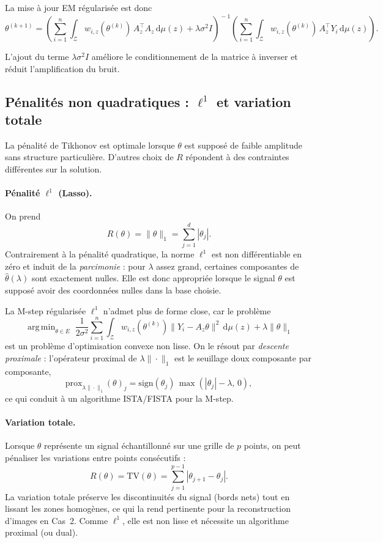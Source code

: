 \documentclass[12pt, a4paper]{article}
\theoremstyle{definition}
\newcommand{\Zcal}{\mathcal{Z}}
\DeclareMathOperator*{\argmin}{arg\,min}
\begin{document}
La mise à jour EM régularisée est donc
\begin{equation}
\label{eq:mstep_reg}
\theta^{(k+1)}
=
\left(
\sum_{i=1}^n \int_{\Zcal}
w_{i,z}(\theta^{(k)})\,
A_z^\top A_z
\,\mathrm{d}\mu(z)
+
\lambda\sigma^2 I
\right)^{\!-1}
\left(
\sum_{i=1}^n \int_{\Zcal}
w_{i,z}(\theta^{(k)})\,
A_z^\top Y_i
\,\mathrm{d}\mu(z)
\right).
\end{equation}

L’ajout du terme $\lambda\sigma^2 I$ améliore le conditionnement de la matrice à
inverser et réduit l’amplification du bruit.

\subsection{Pénalités non quadratiques : $\ell^1$ et variation totale}
\label{subsec:penalites_nonquad}

La pénalité de Tikhonov est optimale lorsque $\theta$ est supposé de faible amplitude
sans structure particulière. D'autres choix de $R$ répondent à des contraintes
différentes sur la solution.

\paragraph{Pénalité $\ell^1$ (Lasso).}
On prend
\[
  R(\theta) = \|\theta\|_1 = \sum_{j=1}^d |\theta_j|.
\]
Contrairement à la pénalité quadratique, la norme $\ell^1$ est non différentiable en
zéro et induit de la \emph{parcimonie} : pour $\lambda$ assez grand, certaines
composantes de $\hat\theta(\lambda)$ sont exactement nulles. Elle est donc appropriée
lorsque le signal $\theta$ est supposé avoir des coordonnées nulles dans la base choisie.

La M-step régularisée $\ell^1$ n'admet plus de forme close, car le problème
\[
  \argmin_{\theta \in E}\;
  \frac{1}{2\sigma^2}
  \sum_{i=1}^n \int_{\Zcal}
  w_{i,z}(\theta^{(k)})\|Y_i - A_z\theta\|^2
  \,\mathrm{d}\mu(z)
  +
  \lambda\|\theta\|_1
\]
est un problème d'optimisation convexe non lisse. On le résout par
\emph{descente proximale} : l'opérateur proximal de $\lambda\|\cdot\|_1$
est le seuillage doux composante par composante,
\[
  \mathrm{prox}_{\lambda\|\cdot\|_1}(\theta)_j
  = \mathrm{sign}(\theta_j)\,\max(|\theta_j| - \lambda,\,0),
\]
ce qui conduit à un algorithme ISTA/FISTA pour la M-step.

\paragraph{Variation totale.}
Lorsque $\theta$ représente un signal échantillonné sur une grille de $p$ points,
on peut pénaliser les variations entre points consécutifs :
\[
  R(\theta) = \mathrm{TV}(\theta)
  = \sum_{j=1}^{p-1} |\theta_{j+1} - \theta_j|.
\]
La variation totale préserve les discontinuités du signal (bords nets) tout en
lissant les zones homogènes, ce qui la rend pertinente pour la reconstruction
d'images en Cas~2. Comme $\ell^1$, elle est non lisse et nécessite un algorithme
proximal (ou dual).
\end{document}
